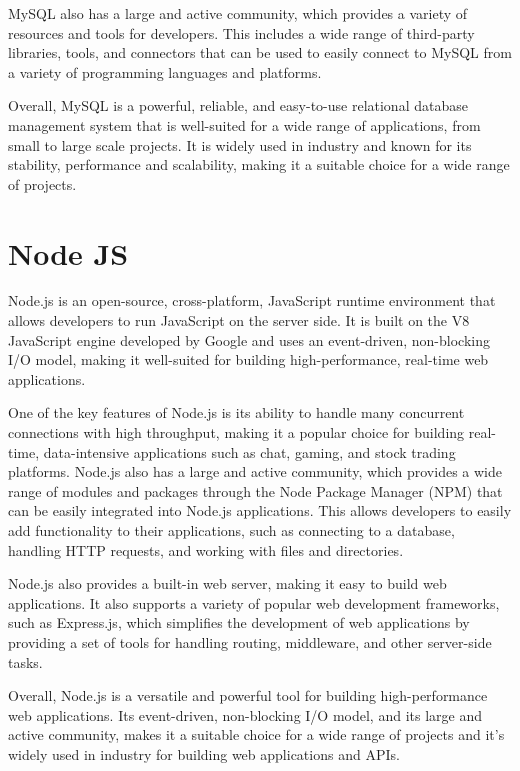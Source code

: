 MySQL also has a large and active community, which provides a variety of resources and tools for developers. This includes a wide range of third-party libraries, tools, and connectors that can be used to easily connect to MySQL from a variety of programming languages and platforms.

Overall, MySQL is a powerful, reliable, and easy-to-use relational database management system that is well-suited for a wide range of applications, from small to large scale projects. It is widely used in industry and known for its stability, performance and scalability, making it a suitable choice for a wide range of projects.

\section{Node JS}
Node.js is an open-source, cross-platform, JavaScript runtime environment that allows developers to run JavaScript on the server side. It is built on the V8 JavaScript engine developed by Google and uses an event-driven, non-blocking I/O model, making it well-suited for building high-performance, real-time web applications.

One of the key features of Node.js is its ability to handle many concurrent connections with high throughput, making it a popular choice for building real-time, data-intensive applications such as chat, gaming, and stock trading platforms. Node.js also has a large and active community, which provides a wide range of modules and packages through the Node Package Manager (NPM) that can be easily integrated into Node.js applications. This allows developers to easily add functionality to their applications, such as connecting to a database, handling HTTP requests, and working with files and directories.

Node.js also provides a built-in web server, making it easy to build web applications. It also supports a variety of popular web development frameworks, such as Express.js, which simplifies the development of web applications by providing a set of tools for handling routing, middleware, and other server-side tasks.

Overall, Node.js is a versatile and powerful tool for building high-performance web applications. Its event-driven, non-blocking I/O model, and its large and active community, makes it a suitable choice for a wide range of projects and it's widely used in industry for building web applications and APIs.

